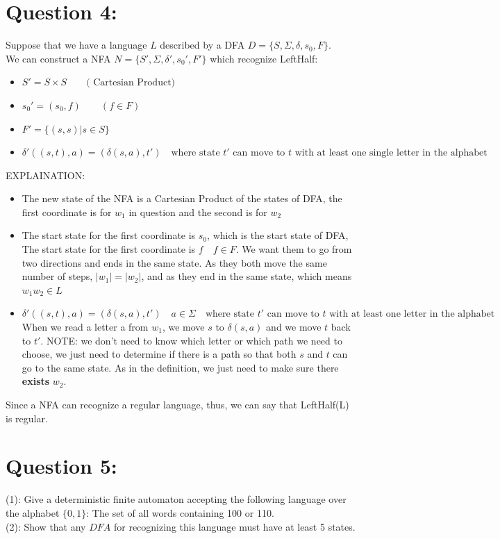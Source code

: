 \documentclass [9 pt]{article}
\theoremstyle{definition}
\begin{document}
\section*{Question 4:}
Suppose that we have a language $L$ described by a DFA $D = \{S, \Sigma, \delta, s_0, F \}$.\\
We can construct a NFA $N = \{ S', \Sigma, \delta', s_0', F' \}$ which recognize LeftHalf:
\begin{itemize}
	\item $S' = S \times S \quad \quad \text{( Cartesian Product)}$
	\item $s_0' = (s_0, f ) \quad \quad (f \in F)$
	\item $F' = \{(s, s)| s \in S  \}$
	\item $\delta' ((s, t), a) = (\delta (s, a), t') \quad \text{where state $t'$ can move to $t$ with at least one single letter in the alphabet  } $
\end{itemize}
EXPLAINATION:
\begin{itemize}
	\item The new state of the NFA is a Cartesian Product of the states of DFA, the first coordinate is for $w_1$ in question and the second is for $w_2$
	\item The start state for the first coordinate is $s_0$, which is the start state of DFA, The start state for the first coordinate is $f \quad f \in F$. We want them to go from two directions and ends in the same state. As they both move the same number of steps, $|w_1| = |w_2|$, and as they end in the same state, which means $w_1 w_2 \in L$
	\item $\delta' ((s, t), a) = (\delta (s, a), t') \quad a \in \Sigma \quad \text{where state $t'$ can move to $t$ with at least one letter in the alphabet  } $
	When we read a letter a from $w_1$, we move $s \text{ to } \delta(s, a)$ and we move $t$ back to $t'$. NOTE: we don't need to know which letter or which path we need to choose, we just need to determine if there is a path so that both $s$ and $t$ can go to the same state. As in the definition, we just need to make sure there \textbf{ exists } $w_2$. 
\end{itemize}
Since a NFA can recognize a regular language, thus, we can say that LeftHalf(L) is regular.

\newpage
\section*{Question 5:}
(1): Give a deterministic finite automaton accepting the following language over the alphabet $\{0, 1\}$: The set of all words containing 100 or 110. \\
\newline
(2): Show that any $DFA$ for recognizing this language must have at least 5 states. 
\end{document}
